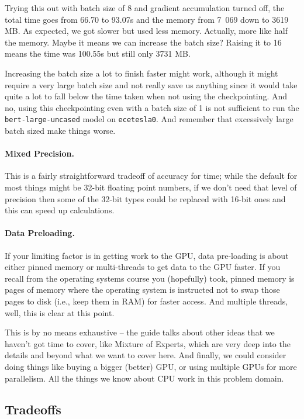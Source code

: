 \documentclass[a4paper]{report}
\begin{document}
Trying this out with batch size of 8 and gradient accumulation turned off, the total time goes from 66.70 to 93.07s and the memory from 7~069 down to 3619 MB. As expected, we got slower but used less memory. Actually, more like half the memory. Maybe it means we can increase the batch size? Raising it to 16 means the time was  100.55s but still only 3731 MB.

Increasing the batch size a lot to finish faster might work, although it might require a very large batch size and not really save us anything since it would take quite a lot to fall below the time taken when not using the checkpointing. And no, using this checkpointing even with a batch size of 1 is not sufficient to run the \texttt{bert-large-uncased} model on \texttt{ecetesla0}. And remember that excessively large batch sized make things worse.

\paragraph{Mixed Precision.} This is a fairly straightforward tradeoff of accuracy for time; while the default for most things might be 32-bit floating point numbers, if we don't need that level of precision then some of the 32-bit types could be replaced with 16-bit ones and this can speed up calculations. 

\paragraph{Data Preloading.} If your limiting factor is in getting work to the GPU, data pre-loading is about either pinned memory or multi-threads to get data to the GPU faster. If you recall from the operating systems course you (hopefully) took, pinned memory is pages of memory where the operating system is instructed not to swap those pages to disk (i.e., keep them in RAM) for faster access. And multiple threads, well, this is clear at this point. 

This is by no means exhaustive -- the guide talks about other ideas that we haven't got time to cover, like Mixture of Experts, which are very deep into the details and beyond what we want to cover here. And finally, we could consider doing things like buying a bigger (better) GPU, or using multiple GPUs for more parallelism. All the things we know about CPU work in this problem domain. 

\subsection*{Tradeoffs}
\end{document}
